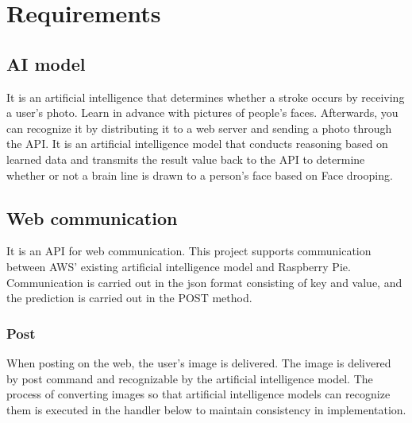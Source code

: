 \section{Requirements}
\subsection{AI model}
It is an artificial intelligence that determines whether a stroke occurs by receiving a user's photo. Learn in advance with pictures of people's faces. Afterwards, you can recognize it by distributing it to a web server and sending a photo through the API. It is an artificial intelligence model that conducts reasoning based on learned data and transmits the result value back to the API to determine whether or not a brain line is drawn to a person's face based on Face drooping.

\subsection{Web communication}
It is an API for web communication. This project supports communication between AWS' existing artificial intelligence model and Raspberry Pie. Communication is carried out in the json format consisting of key and value, and the prediction is carried out in the POST method.
\subsubsection{Post}
When posting on the web, the user's image is delivered. The image is delivered by post command and recognizable by the artificial intelligence model. The process of converting images so that artificial intelligence models can recognize them is executed in the handler below to maintain consistency in implementation.
